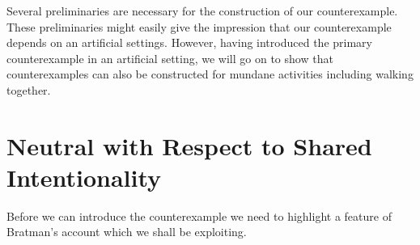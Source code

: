 \documentclass[12pt,\papersize]{extarticle}
\begin{document}
Several preliminaries are necessary for the construction of our counterexample. 
These preliminaries might easily give the impression that our counterexample depends on an artificial settings. 
However, having introduced the primary counterexample in an artificial setting, we will  go on to show that counterexamples can also be constructed for mundane activities including walking together.


%
%
%
%


\section{Neutral with Respect to Shared Intentionality}
\label{sec:netural_wrt_shared_intentionality}
Before we can introduce the counterexample 
we need to highlight a feature of Bratman's account 
	which we shall be exploiting.
\end{document}

